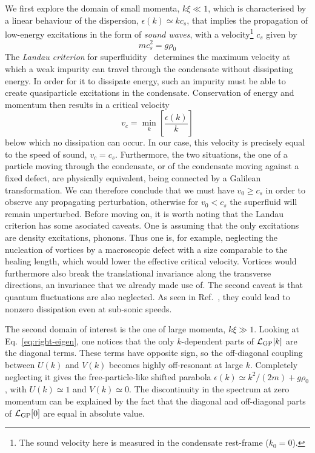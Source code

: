 We first explore the domain of small momenta, $k\xi \ll 1$, which is
characterised by a linear behaviour of the dispersion,
$\epsilon(k) \simeq k c_s$, that implies the propagation of low-energy
excitations in the form of \textit{sound waves}, with a
velocity\footnote{The sound velocity here is measured in the
  condensate rest-frame ($k_0 = 0$).} $c_s$ given by
%
\begin{equation}\label{eq:sound-velocity}
  mc^2_s = g \rho_0
\end{equation}
% 
The \textit{Landau criterion} for superfluidity~\cite{Landau:213304}
determines the maximum velocity at which a weak impurity can travel
through the condensate without dissipating energy. In order for it to
dissipate energy, such an impurity must be able to create
quasiparticle excitations in the condensate. Conservation of energy
and momentum then results in a critical velocity
%
\begin{equation}\label{eq:Landau}
  v_c=\min_{k} \left[\frac{\epsilon(k)}{k}\right]
\end{equation}
% 
below which no dissipation can occur. In our case, this velocity is
precisely equal to the speed of sound, $v_c = c_s$. Furthermore, the
two situations, the one of a particle moving through the condensate,
or of the condensate moving against a fixed defect, are physically
equivalent, being connected by a Galilean transformation. We can
therefore conclude that we must have $v_0 \geq c_s$ in order to
observe any propagating perturbation, otherwise for $v_0 < c_s$ the
superfluid will remain unperturbed. Before moving on, it is worth
noting that the Landau criterion has some asociated caveats.  One is
assuming that the only excitations are density excitations,
phonons. Thus one is, for example, neglecting the nucleation of
vortices by a macroscopic defect with a size comparable to the healing
length, which would lower the effective critical velocity. Vortices
would furthermore also break the translational invariance along the
transverse directions, an invariance that we already made use of. The
second caveat is that quantum fluctuations are also neglected. As seen
in Ref.~\cite{Astrakharchik_2004}, they could lead to nonzero
dissipation even at sub-sonic speeds.

The second domain of interest is the one of large momenta,
$k\xi \gg 1$. Looking at Eq.~\eqref{eq:right-eigen}, one notices that
the only $k$-dependent parts of $\mathcal{L}_{\text{GP}} [k]$ are the
diagonal terms. These terms have opposite sign, so the off-diagonal
coupling between $U(k)$ and $V(k)$ becomes highly off-resonant at
large $k$. Completely neglecting it gives the free-particle-like
shifted parabola $\epsilon(k) \simeq k^2/(2m)+g\rho_0$, with
$U(k) \simeq 1$ and $V(k) \simeq 0$.
%
The discontinuity in the spectrum at zero momentum can be explained by
the fact that the diagonal and off-diagonal parts of $\mathcal{L}_{\text{GP}}
[0]$ are equal in absolute value.

